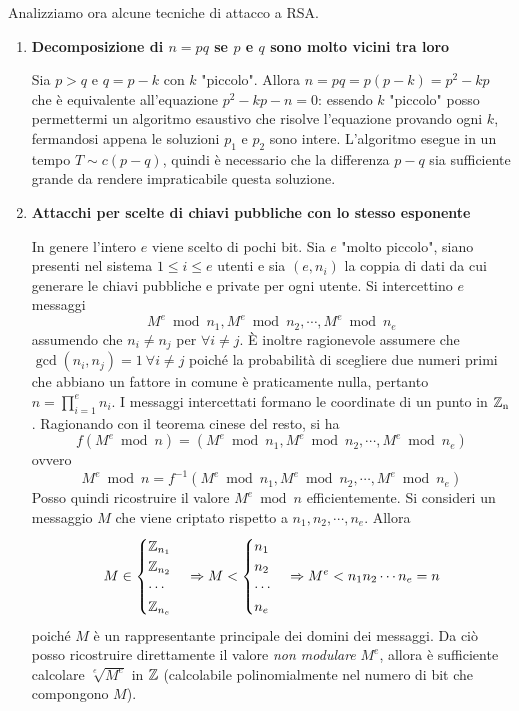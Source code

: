 Analizziamo ora alcune tecniche di attacco a RSA.
\begin{enumerate}
\item \textbf{Decomposizione di $n=pq$ se $p$ e $q$ sono molto vicini tra loro}

Sia $p>q$ e $q=p-k$ con $k$ "piccolo". Allora $n=pq=p(p-k)=p^2-kp$ che è equivalente all'equazione $p^2-kp-n=0$: essendo $k$ "piccolo" posso permettermi un algoritmo esaustivo che risolve l'equazione provando ogni $k$, fermandosi appena le soluzioni $p_1$ e $p_2$ sono intere. L'algoritmo esegue in un tempo $T\sim c(p-q)$, quindi è necessario che la differenza $p-q$ sia sufficiente grande da rendere impraticabile questa soluzione.

\item \textbf{Attacchi per scelte di chiavi pubbliche con lo stesso esponente}

In genere l'intero $e$ viene scelto di pochi bit. Sia $e$ "molto piccolo", siano presenti nel sistema $1\leq i\leq e$ utenti e sia $(e,n_i)$ la coppia di dati da cui generare le chiavi pubbliche e private per ogni utente. Si intercettino $e$ messaggi
\[
M^e\bmod n_1, M^e\bmod n_2, \cdots, M^e\bmod n_e
\]
assumendo che $n_i\neq n_j$ per $\forall i\neq j$. È inoltre ragionevole assumere che $\gcd(n_i,n_j)=1\ \forall i\neq j$ poiché la probabilità di scegliere due numeri primi che abbiano un fattore in comune è praticamente nulla, pertanto $n=\prod_{i=1}^e n_i$.
I messaggi intercettati formano le coordinate di un punto in $\operatorname*{\mathbb{Z}_n}$. Ragionando con il teorema cinese del resto, si ha
\[
f(M^e\bmod n) = (M^e\bmod n_1, M^e\bmod n_2, \cdots, M^e\bmod n_e)
\]
ovvero
\[
M^e\bmod n = f^{-1}(M^e\bmod n_1, M^e\bmod n_2, \cdots, M^e\bmod n_e)
\]
Posso quindi ricostruire il valore $M^e\bmod n$ efficientemente. Si consideri un messaggio $M$ che viene criptato rispetto a $n_1, n_2,\cdots, n_e$. Allora
\[
M\in
\begin{cases}
\operatorname*{\mathbb{Z}}_{n_1} \\
\operatorname*{\mathbb{Z}}_{n_2} \\
\cdots \\
\operatorname*{\mathbb{Z}}_{n_e} \\
\end{cases}
\Rightarrow
M < 
\begin{cases}
n_1 \\
n_2 \\
\cdots \\
n_e
\end{cases}
\Rightarrow M^e < n_1n_2\cdots n_e=n
\]
poiché $M$ è un rappresentante principale dei domini dei messaggi.
Da ciò posso ricostruire direttamente il valore \textit{non modulare} $M^e$, allora è sufficiente calcolare $\sqrt[e]{M^e}$ in $\operatorname*{\mathbb{Z}}$ (calcolabile polinomialmente nel numero di bit che compongono $M$).


\end{enumerate}
